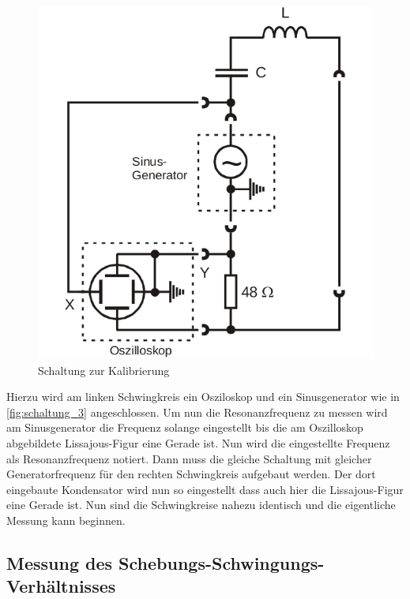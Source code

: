 \begin{figure}
    \centering
    \includegraphics[width=\textwidth/3]{images/schaltung_3.png}
    \caption{Schaltung zur Kalibrierung\cite{V355}}
    \label{fig:schaltung_3}
\end{figure}
Hierzu wird am linken Schwingkreis ein Osziloskop und ein Sinusgenerator wie in \autoref{fig:schaltung_3} angeschlossen. 
Um nun die Resonanzfrequenz zu messen wird am Sinusgenerator die Frequenz solange eingestellt bis die am Oszilloskop abgebildete Lissajous-Figur eine Gerade ist. Nun wird die eingestellte Frequenz als Resonanzfrequenz notiert.
Dann muss die gleiche Schaltung mit gleicher Generatorfrequenz für den rechten Schwingkreis aufgebaut werden.
Der dort eingebaute Kondensator wird nun so eingestellt dass auch hier die Lissajous-Figur eine Gerade ist. Nun sind die Schwingkreise nahezu identisch und die eigentliche Messung kann beginnen.

\subsection{Messung des Schebungs-Schwingungs-Verhältnisses}

